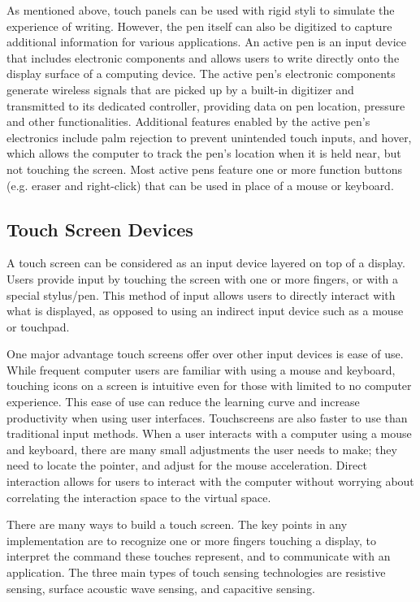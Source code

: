  As mentioned above, touch panels can be used with rigid styli to simulate the experience of writing. 
 However, the pen itself can also be digitized to capture additional information for various applications. 
 An active pen is an input device that includes electronic components and allows users to write directly onto the display surface of a computing device.
 The active pen's electronic components generate wireless signals that are picked up by a built-in digitizer and transmitted to its dedicated controller, providing data on pen location, pressure and other functionalities. 
 Additional features enabled by the active pen's electronics include palm rejection to prevent unintended touch inputs, and hover, which allows the computer to track the pen's location when it is held near, but not touching the screen. 
 Most active pens feature one or more function buttons (e.g. eraser and right-click) that can be used in place of a mouse or keyboard.

\subsection{Touch Screen Devices}

A touch screen can be considered as an input device layered on top of a display. 
Users provide input by touching the screen with one or more fingers, or with a special stylus/pen.
This method of input allows users to directly interact with what is displayed, as opposed to using an indirect input device such as a mouse or touchpad.

One major advantage touch screens offer over other input devices is ease of use.
While frequent computer users are familiar with using a mouse and keyboard, touching icons on a screen is intuitive even for those with limited to no computer experience.
This ease of use can reduce the learning curve and increase productivity when using user interfaces.
Touchscreens are also faster to use than traditional input methods.
When a user interacts with a computer using a mouse and keyboard, there are many small adjustments the user needs to make; they need to locate the pointer, and adjust for the mouse acceleration.
Direct interaction allows for users to interact with the computer without worrying about correlating the interaction space to the virtual space. 

There are many ways to build a touch screen.
The key points in any implementation are to recognize one or more fingers touching a display, to interpret the command these touches represent, and to communicate with an application.
The three main types of touch sensing technologies are resistive sensing, surface acoustic wave sensing, and capacitive sensing.

